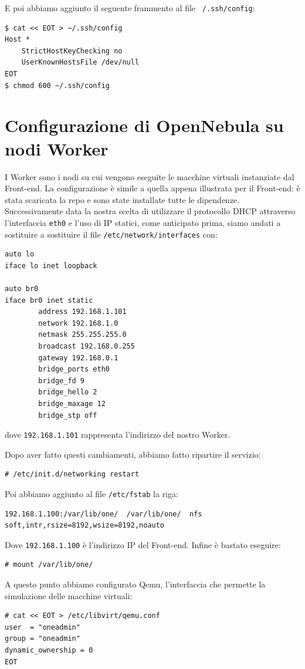 \documentclass[twoside]{article}
\begin{document}
E poi abbiamo aggiunto il seguente frammento al file \texttt{~/.ssh/config}:
\begin{lstlisting}[frame=trBL]
$ cat << EOT > ~/.ssh/config
Host *
    StrictHostKeyChecking no
    UserKnownHostsFile /dev/null
EOT
$ chmod 600 ~/.ssh/config
\end{lstlisting}

\section{Configurazione di OpenNebula su nodi Worker}
I Worker sono i nodi su cui vengono eseguite le macchine virtuali instanziate dal Front-end.
La configurazione è simile a quella appena illustrata per il Front-end: è stata scaricata la repo
e sono state installate tutte le dipendenze. Successivamente data la nostra scelta di utilizzare
il protocollo DHCP attraverso l'interfaccia \texttt{eth0} e l'uso di IP statici, come anticipato prima,
siamo andati a sostituire a sostituire il file \texttt{/etc/network/interfaces} con:
\begin{lstlisting}[frame=trBL]
auto lo
iface lo inet loopback

auto br0
iface br0 inet static
        address 192.168.1.101
        network 192.168.1.0
        netmask 255.255.255.0
        broadcast 192.168.0.255
        gateway 192.168.0.1
        bridge_ports eth0
        bridge_fd 9
        bridge_hello 2
        bridge_maxage 12
        bridge_stp off
\end{lstlisting}
dove \texttt{192.168.1.101} rappresenta l'indirizzo del nostro Worker.

Dopo aver fatto questi cambiamenti, abbiamo fatto ripartire il servizio:
\begin{lstlisting}[frame=trBL]
# /etc/init.d/networking restart
\end{lstlisting}

Poi abbiamo aggiunto al file \texttt{/etc/fstab} la riga:
\begin{lstlisting}[frame=trBL]
192.168.1.100:/var/lib/one/  /var/lib/one/  nfs   soft,intr,rsize=8192,wsize=8192,noauto
\end{lstlisting}

Dove \texttt{192.168.1.100} è l'indirizzo IP del Front-end. Infine è bastato eseguire:
\begin{lstlisting}[frame=trBL]
# mount /var/lib/one/
\end{lstlisting}

A questo punto abbiamo configurato Qemu, l'interfaccia che permette la simulazione delle macchine virtuali:
\begin{lstlisting}[frame=trBL]
# cat << EOT > /etc/libvirt/qemu.conf
user  = "oneadmin"
group = "oneadmin"
dynamic_ownership = 0
EOT
\end{lstlisting}
\end{document}
